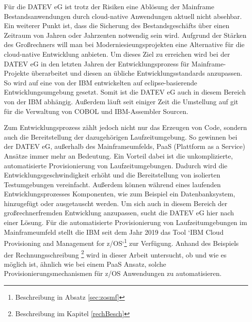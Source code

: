 Für die DATEV eG ist trotz der Risiken eine Ablösung der Mainframe Bestandsanwendungen durch cloud-native Anwendungen aktuell nicht absehbar.
Ein weiterer Punkt ist, dass die Sicherung des Bestandsgeschäfts über einen Zeitraum von Jahren oder Jahrzenten notwendig sein wird.
Aufgrund der Stärken des Großrechners will man bei Moderniesieungsprojekten eine Alternative für die cloud-native Entwicklung anbieten.
Um dieses Ziel zu erreichen wird bei der DATEV eG in den letzten Jahren der Entwicklungsprozess für Mainframe-Projekte überarbeitet und diesen an übliche Entwicklungsstandards anzupassen.
So wird auf eine von der IBM entwickelten auf eclipse-basierende Entwicklungsumgebung gesetzt.
Somit ist die DATEV eG auch in diesem Bereich von der IBM abhängig.
Außerdem läuft seit einiger Zeit die Umstellung auf git für die Verwaltung von COBOL und IBM-Assembler Sourcen.

Zum Entwicklungsprozess zählt jedoch nicht nur das Erzeugen von Code, sondern auch die Bereitstellung der dazugehörigen Laufzeitumgebung.
So gewinnen bei der DATEV eG, außerhalb des Mainframeumfelds, PaaS (Plattform as a Service) Ansätze immer mehr an Bedeutung.
Ein Vorteil dabei ist die unkomplizierte, automatisierte Provisionierung von Laufzeitumgebungen.
Dadurch wird die Entwicklungsgeschwindigkeit erhöht und die Bereitstellung von isolierten Testumgebungen vereinfacht.
Außerdem können während eines laufenden Entwicklungsprozesses Komponenten, wie zum Beispiel ein Datenbanksystem, hinzugefügt oder ausgetauscht werden.
Um sich auch in diesem Bereich der großrechnerfremden Entwicklung anzupassen, sucht die DATEV eG hier nach einer Lösung.
Für die automatisierte Provisionierung von Laufzeitumgebungen im Mainframeumfeld stellt die IBM seit dem Jahr 2019 das Tool `IBM Cloud Provisioning and Management for z/OS`\footnote{Beschreibung in Absatz \ref{sec:zosmf}} zur Verfügung.
Anhand des Beispiels der Rechnungsschreibung \footnote{Beschreibung im Kapitel \ref{rechBesch}} wird in dieser Arbeit untersucht, ob und wie es möglich ist, ähnlich wie bei einem PaaS Ansatz, solche Provisionierungsmechanismen für z/OS Anwendungen zu automatisieren.